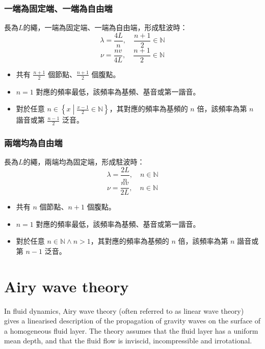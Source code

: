 \documentclass[a4paper,12pt]{report}
\begin{document}
\subsubsection{一端為固定端、一端為自由端}
長為$L$的繩，一端為固定端、一端為自由端，形成駐波時：
\[\lambda = \frac{4L}{n},\quad \frac{n+1}{2}\in\mathbb{N} \]
\[\nu = \frac{nv}{4L},\quad \frac{n+1}{2}\in\mathbb{N} \]
\begin{itemize}
\item 共有 $\frac{n+1}{2}$ 個節點、$\frac{n+1}{2}$ 個腹點。
\item $n=1$ 對應的頻率最低，該頻率為基頻、基音或第一諧音。
\item 對於任意 $n\in\left\{x\middle|\frac{x-1}{2}\in\mathbb{N}\right\}$，其對應的頻率為基頻的 $n$ 倍，該頻率為第 $n$ 諧音或第 $\frac{n-1}{2}$ 泛音。
\end{itemize}
\subsubsection{兩端均為自由端}
長為$L$的繩，兩端均為固定端，形成駐波時：
\[\lambda = \frac{2L}{n},\quad n\in\mathbb{N} \]
\[\nu = \frac{nv}{2L},\quad n\in\mathbb{N} \]
\begin{itemize}
\item 共有 $n$ 個節點、$n+1$ 個腹點。
\item $n=1$ 對應的頻率最低，該頻率為基頻、基音或第一諧音。
\item 對於任意 $n\in\mathbb{N}\land n>1$，其對應的頻率為基頻的 $n$ 倍，該頻率為第 $n$ 諧音或第 $n-1$ 泛音。
\end{itemize}


\section{Airy wave theory}
In fluid dynamics, Airy wave theory (often referred to as linear wave theory) gives a linearised description of the propagation of gravity waves on the surface of a homogeneous fluid layer. The theory assumes that the fluid layer has a uniform mean depth, and that the fluid flow is inviscid, incompressible and irrotational.
\end{document}

